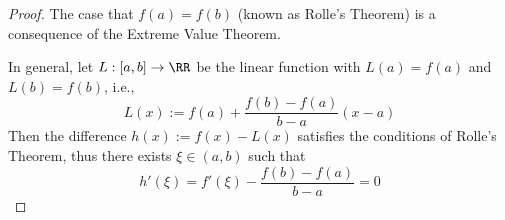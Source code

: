 

\begin{proof}
The case that $f(a)=f(b)$ (known as Rolle's Theorem) 
is a consequence of the Extreme Value Theorem.

In general, let $L:[a,b]\to\RR$ be the linear function 
with $L(a)=f(a)$ and $L(b)=f(b)$, i.e.,
$$
L(x):=f(a) + \frac{f(b)-f(a)}{b-a}(x-a)
$$
Then the difference $h(x):=f(x)-L(x)$ satisfies the conditions 
of Rolle's Theorem, thus there exists $\xi\in(a,b)$ such 
that 
$$
h'(\xi) = f'(\xi)-\frac{f(b)-f(a)}{b-a} = 0
$$

\end{proof}

